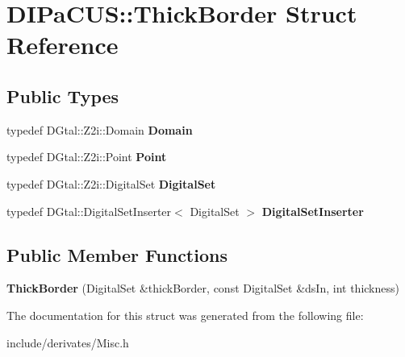 \hypertarget{structDIPaCUS_1_1ThickBorder}{}\section{D\+I\+Pa\+C\+US\+:\+:Thick\+Border Struct Reference}
\label{structDIPaCUS_1_1ThickBorder}
\subsection*{Public Types}
\begin{DoxyCompactItemize}
\item 
\mbox{\label{structDIPaCUS_1_1ThickBorder_aac50b52e6ad114c142123adaf87fc2b7}} 
typedef D\+Gtal\+::\+Z2i\+::\+Domain {\bfseries Domain}
\item 
\mbox{\label{structDIPaCUS_1_1ThickBorder_a9abad81b6c2e95983074c5100395f10a}} 
typedef D\+Gtal\+::\+Z2i\+::\+Point {\bfseries Point}
\item 
\mbox{\label{structDIPaCUS_1_1ThickBorder_aedc0d0bcd3b9d445f53a659d2e989753}} 
typedef D\+Gtal\+::\+Z2i\+::\+Digital\+Set {\bfseries Digital\+Set}
\item 
\mbox{\label{structDIPaCUS_1_1ThickBorder_ab87393b8881e0f0072ad6ce791e6e959}} 
typedef D\+Gtal\+::\+Digital\+Set\+Inserter$<$ Digital\+Set $>$ {\bfseries Digital\+Set\+Inserter}
\end{DoxyCompactItemize}
\subsection*{Public Member Functions}
\begin{DoxyCompactItemize}
\item 
\mbox{\label{structDIPaCUS_1_1ThickBorder_a3ff232f943238dc0961886fb0e697956}} 
{\bfseries Thick\+Border} (Digital\+Set \&thick\+Border, const Digital\+Set \&ds\+In, int thickness)
\end{DoxyCompactItemize}


The documentation for this struct was generated from the following file\+:\begin{DoxyCompactItemize}
\item 
include/derivates/Misc.\+h\end{DoxyCompactItemize}
